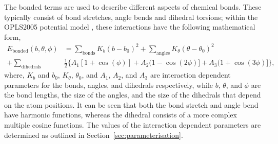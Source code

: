 The bonded terms are used to describe different aspects of chemical bonds.
These typically consist of bond stretches, angle bends and dihedral torsions; within the OPLS2005 potential model \cite{banks_integrated_2005}, these interactions have the following mathematical form,
%
\begin{equation}
\begin{aligned}
  E_{\text{bonded}}(b, \theta, \phi) & = \sum_{\text{bonds}}K_b(b-b_0)^2 + \sum_{\text{angles}}K_{\theta}(\theta-\theta_0)^2 \\
  + \sum_{\text{dihedrals}} & \frac{1}{2}\big\{A_1[1 + \cos(\phi)] + A_2(1 - \cos(2\phi)] + A_3(1 + \cos(3\phi)]\big\},
\end{aligned}
\end{equation}
%
where, $K_b$ and $b_0$, $K_{\theta}$, $\theta_0$, and $A_1$, $A_2$, and $A_3$ are interaction dependent parameters for the bonds, angles, and dihedrals respectively, while $b$, $\theta$, and $\phi$ are the bond lengths, the size of the angles, and the size of the dihedrals that depend on the atom positions.
It can be seen that both the bond stretch and angle bend have harmonic functions, whereas the dihedral consists of a more complex multiple cosine functions.
The values of the interaction dependent parameters are determined as outlined in Section~\ref{sec:parameterisation}.

